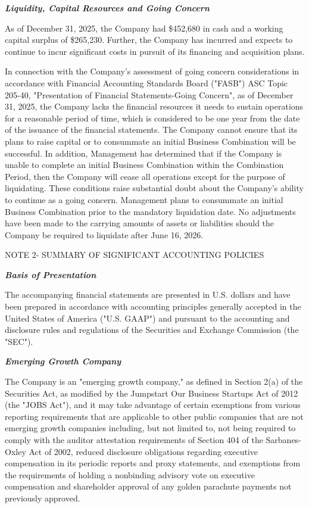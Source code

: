 \documentclass[11pt,a4paper]{article}
\begin{document}
\textit{\textbf{Liquidity, Capital Resources and Going Concern}}

As of December 31, 2025, the Company had \$452,680 in cash and a working capital surplus of \$265,230. Further, the Company has incurred and expects to continue to incur significant costs in pursuit of its financing and acquisition plans.

In connection with the Company's assessment of going concern considerations in accordance with Financial Accounting Standards Board ("FASB") ASC Topic 205-40, "Presentation of Financial Statements-Going Concern", as of December 31, 2025, the Company lacks the financial resources it needs to sustain operations for a reasonable period of time, which is considered to be one year from the date of the issuance of the financial statements. The Company cannot ensure that its plans to raise capital or to consummate an initial Business Combination will be successful. In addition, Management has determined that if the Company is unable to complete an initial Business Combination within the Combination Period, then the Company will cease all operations except for the purpose of liquidating. These conditions raise substantial doubt about the Company's ability to continue as a going concern. Management plans to consummate an initial Business Combination prior to the mandatory liquidation date. No adjustments have been made to the carrying amounts of assets or liabilities should the Company be required to liquidate after June 16, 2026.

NOTE 2- SUMMARY OF SIGNIFICANT ACCOUNTING POLICIES

\textit{\textbf{Basis of Presentation}}

The accompanying financial statements are presented in U.S. dollars and have been prepared in accordance with accounting principles generally accepted in the United States of America ("U.S. GAAP") and pursuant to the accounting and disclosure rules and regulations of the Securities and Exchange Commission (the "SEC").

\textit{\textbf{Emerging Growth Company}}

The Company is an "emerging growth company," as defined in Section 2(a) of the Securities Act, as modified by the Jumpstart Our Business Startups Act of 2012 (the "JOBS Act"), and it may take advantage of certain exemptions from various reporting requirements that are applicable to other public companies that are not emerging growth companies including, but not limited to, not being required to comply with the auditor attestation requirements of Section 404 of the Sarbanes-Oxley Act of 2002, reduced disclosure obligations regarding executive compensation in its periodic reports and proxy statements, and exemptions from the requirements of holding a nonbinding advisory vote on executive compensation and shareholder approval of any golden parachute payments not previously approved.
\end{document}
